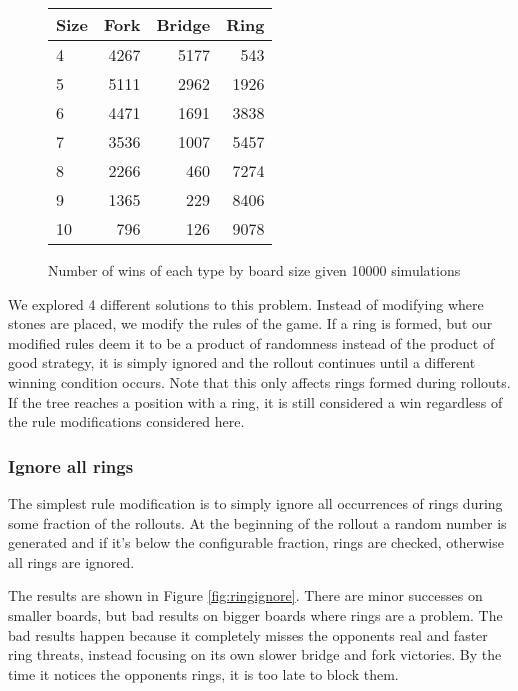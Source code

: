\begin{figure}
	\centering
	\begin{tabular}{l|rrr}
		Size & Fork & Bridge & Ring \\ \hline
		   4 & 4267 &   5177 &  543 \\
		   5 & 5111 &   2962 & 1926 \\
		   6 & 4471 &   1691 & 3838 \\
		   7 & 3536 &   1007 & 5457 \\
		   8 & 2266 &    460 & 7274 \\
		   9 & 1365 &    229 & 8406 \\
		   10 & 796 &    126 & 9078 \\
	\end{tabular}
	\caption{Number of wins of each type by board size given 10000 simulations}
	\label{tab:wintypes}
\end{figure}

We explored 4 different solutions to this problem. Instead of modifying where stones are placed, we modify the rules of the game. If a ring is formed, but our modified rules deem it to be a product of randomness instead of the product of good strategy, it is simply ignored and the rollout continues until a different winning condition occurs. Note that this only affects rings formed during rollouts. If the tree reaches a position with a ring, it is still considered a win regardless of the rule modifications considered here.

\subsubsection{Ignore all rings}

The simplest rule modification is to simply ignore all occurrences of rings during some fraction of the rollouts. At the beginning of the rollout a random number is generated and if it's below the configurable fraction, rings are checked, otherwise all rings are ignored.

The results are shown in Figure \ref{fig:ringignore}. There are minor successes on smaller boards, but bad results on bigger boards where rings are a problem. The bad results happen because it completely misses the opponents real and faster ring threats, instead focusing on its own slower bridge and fork victories. By the time it notices the opponents rings, it is too late to block them.

